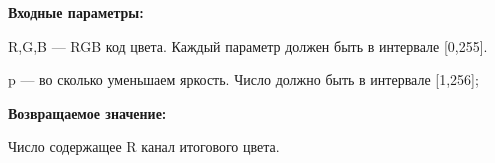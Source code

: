 \textbf{Входные параметры:}  

R,G,B --- RGB код цвета. Каждый параметр должен быть в интервале [0,255].

p --- во сколько уменьшаем яркость. Число должно быть в интервале [1,256];

\textbf{Возвращаемое значение:}

Число содержащее R канал итогового цвета.